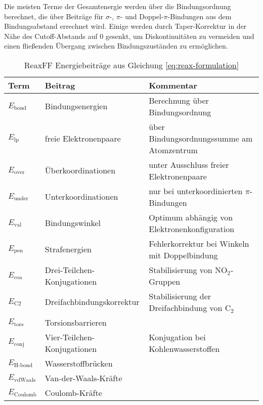 Die meisten Terme der Gesamtenergie werden über die Bindungsordnung berechnet, die über Beiträge für $\sigma$-, $\pi$- und Doppel-$\pi$-Bindungen aus dem Bindungsabstand errechnet wird.
Einige werden durch Taper-Korrektur in der Nähe des Cutoff-Abstands auf 0 gesenkt, um Diskontinuitäten zu vermeiden und einen fließenden Übergang zwischen Bindungszuständen zu ermöglichen.


\begin{table}
  \begin{tabularx}{\textwidth}{|llX|}
    \hline
    \textbf{Term}      & \textbf{Beitrag}            & \textbf{Kommentar}                            \\
    \hline
    $E_\text{bond}$    & Bindungsenergien            & Berechnung über Bindungsordnung               \\
    $E_\text{lp}$      & freie Elektronenpaare       & über Bindungsordnungssumme am Atomzentrum     \\
    $E_\text{over}$    & Überkoordinationen          & unter Ausschluss freier Elektronenpaare       \\
    $E_\text{under}$   & Unterkoordinationen         & nur bei unterkoordinierten $\pi$-Bindungen    \\
    $E_\text{val}$     & Bindungswinkel              & Optimum abhängig von Elektronenkonfiguration  \\
    $E_\text{pen}$     & Strafenergien               & Fehlerkorrektur bei Winkeln mit Doppelbindung \\
    $E_\text{coa}$     & Drei-Teilchen-Konjugationen & Stabilisierung von NO$_2$-Gruppen             \\
    $E_\text{C2}$      & Dreifachbindungskorrektur   & Stabilisierung der Dreifachbindung von C$_2$  \\
    $E_\text{tors}$    & Torsionsbarrieren           &                                               \\
    $E_\text{conj}$    & Vier-Teilchen-Konjugationen & Konjugation bei Kohlenwasserstoffen           \\
    $E_\text{H-bond}$  & Wasserstoffbrücken          &                                               \\
    $E_\text{vdWaals}$ & Van-der-Waals-Kräfte        &                                               \\
    $E_\text{Coulomb}$ & Coulomb-Kräfte              &                                               \\
    \hline
  \end{tabularx}
  \caption[ReaxFF Energiebeiträge]{ReaxFF Energiebeiträge aus Gleichung \ref{eq:reax-formulation}}
  \label{tab:reax-energies}
\end{table}

